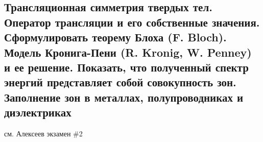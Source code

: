 \subsection{Трансляционная симметрия твердых тел. Оператор трансляции и его собственные значения.
Сформулировать теорему Блоха (F. Bloch). Модель Кронига-Пени (R. Kronig, W. Penney) и ее
решение. Показать, что полученный спектр энергий представляет собой совокупность зон.
Заполнение зон в металлах, полупроводниках и диэлектриках}

см. Алексеев экзамен \#2


